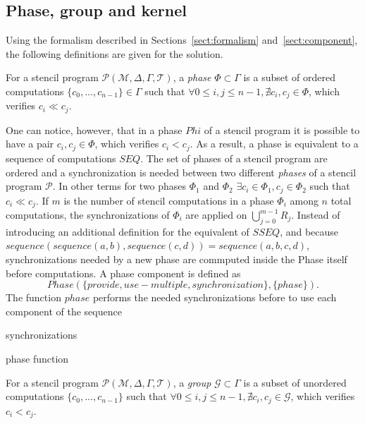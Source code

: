 \subsection{Phase, group and kernel}
Using the formalism described in Sections~\ref{sect:formalism} and~\ref{sect:component}, the following definitions are given for the solution.

\medskip
\begin{mydef}
For a stencil program $\mathcal{P}(\mathcal{M},\Delta,\Gamma,\mathcal{T})$, a \emph{phase} $\Phi \subset \Gamma$ is a subset of ordered computations $\{c_0,...,c_{n-1}\} \in \Gamma$ such that $\forall 0 \leq i,j \leq n-1, \nexists c_i,c_j \in \Phi$, which verifies $c_i \ll c_j$.
\end{mydef}

One can notice, however, that in a phase $Phi$ of a stencil program it is possible to have a pair $c_i,c_j \in \Phi$, which verifies $c_i<c_j$. As a result, a phase is equivalent to a sequence of computations $SEQ$. The set of phases of a stencil program are ordered and a synchronization is needed between two different \emph{phases} of a stencil program $\mathcal{P}$. In other terms for two phases $\Phi_1$ and $\Phi_2$ $\exists c_i \in \Phi_1, c_j \in \Phi_2$ such that $c_i \ll c_j$. If $m$ is the number of stencil computations in a phase $\Phi_i$ among $n$ total computations, the synchronizations of $\Phi_i$ are applied on $\bigcup_{j=0}^{m-1}R_j$. Instead of introducing an additional definition for the equivalent of $SSEQ$, and because $sequence(sequence(a,b),sequence(c,d))=sequence(a,b,c,d)$, synchronizations needed by a new phase are commputed inside the Phase itself before computations. A phase component is defined as
\begin{equation}
Phase(\{provide,use-multiple, synchronization\},\{phase\}).
\end{equation}
 The function $phase$ performs the needed synchronizations before to use each component of the sequence

\begin{algorithm}[H]
 synchronizations\\
 \caption{phase function}
 \end{algorithm}

\begin{mydef}
For a stencil program $\mathcal{P}(\mathcal{M},\Delta,\Gamma,\mathcal{T})$, a \emph{group} $\mathcal{G} \subset \Gamma$ is a subset of unordered computations $\{c_0,...,c_{n-1}\}$ such that $\forall 0 \leq i,j \leq n-1, \nexists c_i,c_j \in \mathcal{G}$, which verifies $c_i<c_j$.
\end{mydef}

